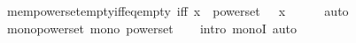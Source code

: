 \begin{isabellebody}
\isanewline
{}\isamarkupfalse%
\ mem{\isacharunderscore}{\kern0pt}powerset{\isacharunderscore}{\kern0pt}empty{\isacharunderscore}{\kern0pt}iff{\isacharunderscore}{\kern0pt}eq{\isacharunderscore}{\kern0pt}empty\ {\isacharbrackleft}{\kern0pt}iff{\isacharbrackright}{\kern0pt}{\isacharcolon}{\kern0pt}\ {\isachardoublequoteopen}x\ {\isasymin}\ powerset\ {\isacharbraceleft}{\kern0pt}{\isacharbraceright}{\kern0pt}\ {\isasymlongleftrightarrow}\ x\ {\isacharequal}{\kern0pt}\ {\isacharbraceleft}{\kern0pt}{\isacharbraceright}{\kern0pt}{\isachardoublequoteclose}\isanewline
%
\isadelimproof
\ \ %
\endisadelimproof
%
\isatagproof
{}\isamarkupfalse%
\ auto%
\endisatagproof
{\isafoldproof}%
%
\isadelimproof
\isanewline
%
\endisadelimproof
\isanewline
{}\isamarkupfalse%
\ mono{\isacharunderscore}{\kern0pt}powerset{\isacharcolon}{\kern0pt}\ {\isachardoublequoteopen}mono\ powerset{\isachardoublequoteclose}\isanewline
%
\isadelimproof
\ \ %
\endisadelimproof
%
\isatagproof
{}\isamarkupfalse%
\ {\isacharparenleft}{\kern0pt}intro\ monoI{\isacharparenright}{\kern0pt}\ auto%
\endisatagproof
{\isafoldproof}%
%
\isadelimproof
\isanewline
%
\endisadelimproof
%
\isadelimtheory
\isanewline
%
\endisadelimtheory
%
\isatagtheory
{}\isamarkupfalse%
%
\endisatagtheory
{\isafoldtheory}%
%
\isadelimtheory
%
\endisadelimtheory
%
\end{isabellebody}%
\endinput
